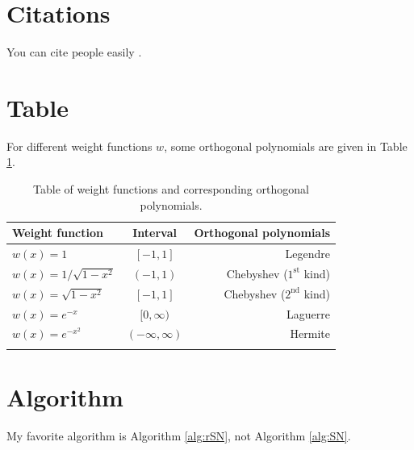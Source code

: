 \section{Citations}
You can cite people easily \cite{camminady2017nonclassical}. 




\section{Table}
For different weight functions $w$, some orthogonal polynomials are given in Table
\ref{tab:orthopolys}.


\begin{table}
	\centering
	\begin{tabular}{lcr}
		\toprule
		\hfill Weight function \hfill & Interval           & \hfill Orthogonal polynomials \hfill \\
		\midrule
		$w(x) = 1$                    & $[-1,1]$           & Legendre                             \\ \addlinespace
		$w(x) = 1/\sqrt{1-x^2}$       & $(-1,1)$           & Chebyshev ($1^{\text{st}}$ kind)     \\
		\addlinespace
		$w(x) = \sqrt{1-x^2}$         & $[-1,1]$           & Chebyshev  ($2^{\text{nd}}$ kind)    \\
		\addlinespace
		$w(x) = e^{-x}$               & $[0,\infty)$       & Laguerre                             \\ \addlinespace
		$w(x) = e^{-x^2}$             & $(-\infty,\infty)$ & Hermite                              \\ \addlinespace
		\bottomrule
	\end{tabular}
	\caption{Table of weight functions and corresponding orthogonal polynomials.}
	\label{tab:orthopolys}
\end{table}


\section{Algorithm}


My favorite algorithm is Algorithm \ref{alg:rSN}, not Algorithm \ref{alg:SN}.

\renewcommand{\highlight}[1]{\setlength{\fboxsep}{2pt}\colorbox{kitgreen100!0}{{\color{kitgreen100}$\displaystyle #1$}}}
\newcommand{\fakehighlight}[1]{\setlength{\fboxsep}{2pt}\colorbox{kitgreen100!0}{{$\displaystyle #1$}}}


